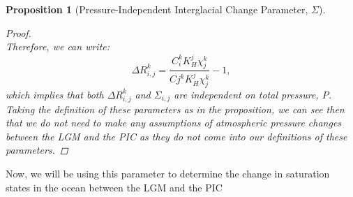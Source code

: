 \documentclass[11pt]{article}
\newtheorem*{prop}{Proposition}
\begin{document}
\begin{prop}[Pressure-Independent Interglacial Change Parameter, $\Sigma$]
\begin{proof}
\begin{equation*}
		\end{equation*}
		Therefore, we can write:
		\begin{equation*}
                	\Delta R_{i,j}^k = \frac{C_i^kK_H^j\chi_j^k}{Cj^kK_H^j\chi_j^k} - 1,
	        \end{equation*}
		which implies that both $\Delta R_{i,j}^k$ and $\Sigma_{i,j}$ are independent on total pressure, $P$.
		Taking the definition of these parameters as in the proposition, we can see then that we do not need to make any assumptions of atmospheric pressure changes between the LGM and the PIC as they do not come into our definitions of these parameters.
	\end{proof}
\end{prop}
Now, we will be using this parameter to determine the change in saturation states in the ocean between the LGM and the PIC




\end{document}
